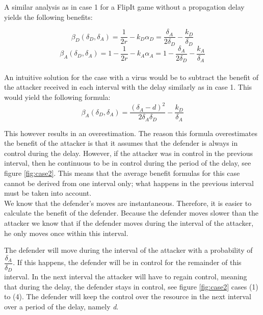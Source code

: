 A similar analysis as in case 1 for a FlipIt game without a propagation delay yields the following benefits:

\begin{equation*}
\beta_{D}(\delta_{D},\delta_{A}) = \dfrac {1} {2r} - k_{D} \alpha_{D} = \dfrac {\delta_{A}} {2\delta_{D}} - \dfrac{k_{D} }{\delta_{D}} 
\end{equation*}
\begin{equation*}
\beta_{A}(\delta_{D},\delta_{A}) =1 - \dfrac {1} {2r} - k_{A} \alpha_{A} = 1- \dfrac {\delta_{A}} {2\delta_{D}} - \dfrac{k_{A}}{ \delta_{A}}  
\end{equation*}\\

An intuitive solution for the case with a virus would be to subtract the benefit of the attacker received in each interval with the delay similarly as in case 1. This would yield the following formula:
\begin{equation*}
\beta_{A}(\delta_{D},\delta_{A})=\dfrac{(\delta_{A} - d)^2}{2\delta_{A}\delta_{D}} - \dfrac{k_{D}}{\delta_{A}}
\end{equation*}

This however results in an overestimation. 
The reason this formula overestimates the benefit of the attacker is that it assumes that the defender is always in control during the delay. However, if the attacker was in control in the previous interval, then he continuous to be in control during the period of the delay, see figure \ref{fig:case2}. This means that the average benefit formulas for this case cannot be derived from one interval only; what happens in the previous interval must be taken into account. \\

We know that the defender's moves are instantaneous. Therefore, it is easier to calculate the benefit of the defender. Because the defender moves slower than the attacker we know that if the defender moves during the interval of the attacker, he only moves once within this interval.

The defender will move during the interval of the attacker with a probability of $\dfrac{\delta_{A}}{\delta_{D}} $. If this happens, the defender will be in control for the remainder of this interval. In the next interval the attacker will have to regain control, meaning that during the delay, the defender stays in control, see figure \ref{fig:case2} cases (1) to (4). The defender will keep the control over the resource in the next interval over a period of the delay, namely \textit{d}. \\

